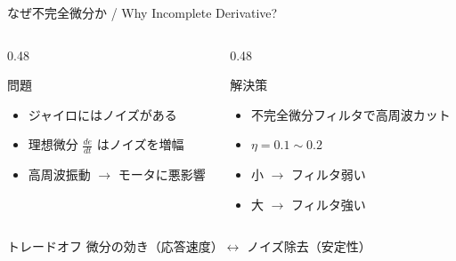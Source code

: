 \begin{frame}{なぜ不完全微分か / Why Incomplete Derivative?}
  \begin{columns}[T]
    \begin{column}{0.48\textwidth}
      \begin{alertblock}{問題}
        \begin{itemize}
          \item ジャイロにはノイズがある
          \item 理想微分 $\frac{de}{dt}$ はノイズを増幅
          \item 高周波振動 $\to$ モータに悪影響
        \end{itemize}
      \end{alertblock}
    \end{column}
    \begin{column}{0.48\textwidth}
      \begin{exampleblock}{解決策}
        \begin{itemize}
          \item 不完全微分フィルタで高周波カット
          \item $\eta = 0.1 \sim 0.2$
          \item 小 $\to$ フィルタ弱い
          \item 大 $\to$ フィルタ強い
        \end{itemize}
      \end{exampleblock}
    \end{column}
  \end{columns}

  \vspace{0.8em}

  \begin{block}{トレードオフ}
    微分の効き（応答速度）$\longleftrightarrow$ ノイズ除去（安定性）
  \end{block}
\end{frame}

